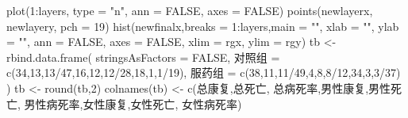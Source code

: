 \documentclass[]{tufte-book}
\newenvironment{Shaded}{}{}
\newcommand{\AttributeTok}[1]{\textcolor[rgb]{0.49,0.56,0.16}{#1}}
\newcommand{\ConstantTok}[1]{\textcolor[rgb]{0.53,0.00,0.00}{#1}}
\newcommand{\DecValTok}[1]{\textcolor[rgb]{0.25,0.63,0.44}{#1}}
\newcommand{\FunctionTok}[1]{\textcolor[rgb]{0.02,0.16,0.49}{#1}}
\newcommand{\NormalTok}[1]{#1}
\newcommand{\OtherTok}[1]{\textcolor[rgb]{0.00,0.44,0.13}{#1}}
\newcommand{\SpecialCharTok}[1]{\textcolor[rgb]{0.25,0.44,0.63}{#1}}
\newcommand{\StringTok}[1]{\textcolor[rgb]{0.25,0.44,0.63}{#1}}
\begin{document}
\begin{Shaded}
\begin{Highlighting}[]
\FunctionTok{plot}\NormalTok{(}\DecValTok{1}\SpecialCharTok{:}\NormalTok{layers, }\AttributeTok{type =} \StringTok{"n"}\NormalTok{, }\AttributeTok{ann =} \ConstantTok{FALSE}\NormalTok{, }\AttributeTok{axes =} \ConstantTok{FALSE}\NormalTok{)}
\FunctionTok{points}\NormalTok{(newlayerx, newlayery, }\AttributeTok{pch =} \DecValTok{19}\NormalTok{)}
\FunctionTok{hist}\NormalTok{(newfinalx,}\AttributeTok{breaks =} \DecValTok{1}\SpecialCharTok{:}\NormalTok{layers,}\AttributeTok{main =} \StringTok{""}\NormalTok{, }\AttributeTok{xlab =} \StringTok{""}\NormalTok{, }\AttributeTok{ylab =} \StringTok{""}\NormalTok{, }\AttributeTok{ann =} \ConstantTok{FALSE}\NormalTok{, }\AttributeTok{axes =} \ConstantTok{FALSE}\NormalTok{, }\AttributeTok{xlim =}\NormalTok{ rgx, }\AttributeTok{ylim =}\NormalTok{ rgy)}
\NormalTok{tb }\OtherTok{\textless{}{-}} \FunctionTok{rbind.data.frame}\NormalTok{(}
        \AttributeTok{stringsAsFactors =} \ConstantTok{FALSE}\NormalTok{,}
\NormalTok{        对照组 }\OtherTok{=} \FunctionTok{c}\NormalTok{(}\DecValTok{34}\NormalTok{,}\DecValTok{13}\NormalTok{,}\DecValTok{13}\SpecialCharTok{/}\DecValTok{47}\NormalTok{,}\DecValTok{16}\NormalTok{,}\DecValTok{12}\NormalTok{,}\DecValTok{12}\SpecialCharTok{/}\DecValTok{28}\NormalTok{,}\DecValTok{18}\NormalTok{,}\DecValTok{1}\NormalTok{,}\DecValTok{1}\SpecialCharTok{/}\DecValTok{19}\NormalTok{),}
\NormalTok{        服药组 }\OtherTok{=} \FunctionTok{c}\NormalTok{(}\DecValTok{38}\NormalTok{,}\DecValTok{11}\NormalTok{,}\DecValTok{11}\SpecialCharTok{/}\DecValTok{49}\NormalTok{,}\DecValTok{4}\NormalTok{,}\DecValTok{8}\NormalTok{,}\DecValTok{8}\SpecialCharTok{/}\DecValTok{12}\NormalTok{,}\DecValTok{34}\NormalTok{,}\DecValTok{3}\NormalTok{,}\DecValTok{3}\SpecialCharTok{/}\DecValTok{37}\NormalTok{)}
\NormalTok{        )}
\NormalTok{tb }\OtherTok{\textless{}{-}} \FunctionTok{round}\NormalTok{(tb,}\DecValTok{2}\NormalTok{)}
\FunctionTok{colnames}\NormalTok{(tb) }\OtherTok{\textless{}{-}} \FunctionTok{c}\NormalTok{(}\StringTok{\textquotesingle{}总康复\textquotesingle{}}\NormalTok{,}\StringTok{\textquotesingle{}总死亡\textquotesingle{}}\NormalTok{, }\StringTok{\textquotesingle{}总病死率\textquotesingle{}}\NormalTok{,}\StringTok{\textquotesingle{}男性康复\textquotesingle{}}\NormalTok{,}\StringTok{\textquotesingle{}男性死亡\textquotesingle{}}\NormalTok{, }\StringTok{\textquotesingle{}男性病死率\textquotesingle{}}\NormalTok{,}\StringTok{\textquotesingle{}女性康复\textquotesingle{}}\NormalTok{,}\StringTok{\textquotesingle{}女性死亡\textquotesingle{}}\NormalTok{, }\StringTok{\textquotesingle{}女性病死率\textquotesingle{}}\NormalTok{)}

\end{Highlighting}
\end{Shaded}
\end{document}
